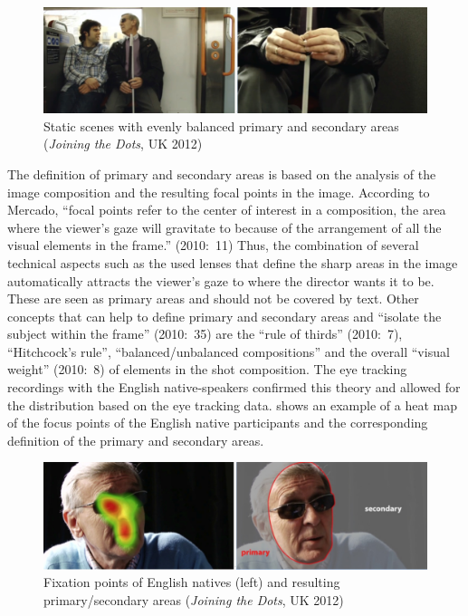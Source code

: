\documentclass[output=paper]{langsci/langscibook}
\begin{document}
\begin{figure}
 \includegraphics[width=\textwidth]{figures/Fox2.png}
 \caption{Static scenes with evenly balanced primary and secondary areas (\textit{Joining the Dots}, UK 2012)}
 \label{fox:fig:2}
\end{figure} 

The definition of primary and secondary areas is based on the analysis of the image composition and the resulting focal points in the image. According to Mercado, ``focal points refer to the center of interest in a composition, the area where the viewer's gaze will gravitate to because of the arrangement of all the visual elements in the frame.'' (2010:~11) Thus, the combination of several technical aspects such as the used lenses that define the sharp areas in the image automatically attracts the viewer's gaze to where the director wants it to be. These are seen as primary areas and should not be covered by text. Other concepts that can help to define primary and secondary areas and ``isolate the subject within the frame'' (2010:~35) are the ``rule of thirds'' (2010:~7), ``Hitchcock's rule'', ``balanced/unbalanced compositions'' and the overall ``visual weight'' (2010:~8) of elements in the shot composition. The eye tracking recordings with the English native-speakers confirmed this theory and allowed for the distribution based on the eye tracking data.  shows an example of a heat map of the focus points of the English native participants and the corresponding definition of the primary and secondary areas.

\begin{figure}[b]
 \includegraphics[width=\textwidth]{figures/Fox3.png}
 \caption{Fixation points of English natives (left) and resulting primary/secondary areas (\textit{Joining the Dots}, UK 2012)}
 \label{fox:fig:3}
\end{figure}  
\end{document}

